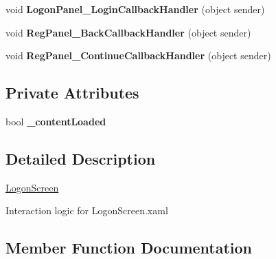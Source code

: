 \begin{DoxyCompactItemize}
void {\bfseries Logon\+Panel\+\_\+\+Login\+Callback\+Handler} (object sender)
\item 
\mbox{\label{class_wpf_handler_1_1_u_i_1_1_controls_1_1_logon_1_1_logon_screen_a7cadc878b1d75999cefdb12939c2167c}} 
void {\bfseries Reg\+Panel\+\_\+\+Back\+Callback\+Handler} (object sender)
\item 
\mbox{\label{class_wpf_handler_1_1_u_i_1_1_controls_1_1_logon_1_1_logon_screen_a917a514f4651d57e74471217591e203e}} 
void {\bfseries Reg\+Panel\+\_\+\+Continue\+Callback\+Handler} (object sender)
\end{DoxyCompactItemize}
\subsection*{Private Attributes}
\begin{DoxyCompactItemize}
\item 
\mbox{\label{class_wpf_handler_1_1_u_i_1_1_controls_1_1_logon_1_1_logon_screen_a507b43de13994d560610ccfda99d1b21}} 
bool {\bfseries \+\_\+content\+Loaded}
\end{DoxyCompactItemize}


\subsection{Detailed Description}
\mbox{\hyperlink{class_wpf_handler_1_1_u_i_1_1_controls_1_1_logon_1_1_logon_screen}{Logon\+Screen}} 

Interaction logic for Logon\+Screen.\+xaml 

\subsection{Member Function Documentation}
\mbox{\label{class_wpf_handler_1_1_u_i_1_1_controls_1_1_logon_1_1_logon_screen_aea4275b155b6aa31830e1e492bb881b0}} 
